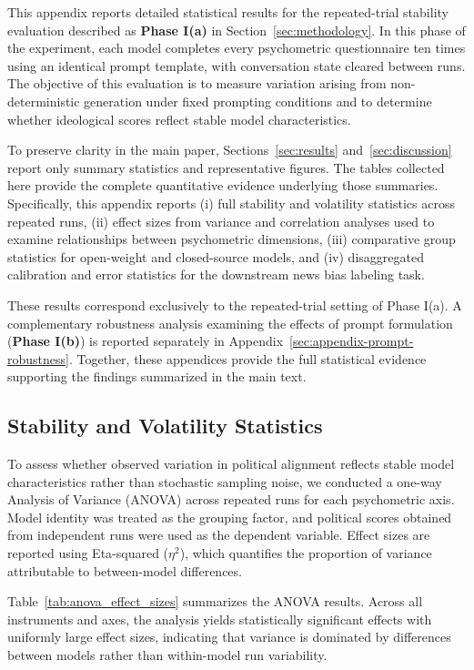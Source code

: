 \documentclass[11pt]{article}
\begin{document}
This appendix reports detailed statistical results for the repeated-trial stability evaluation described as \textbf{Phase I(a)} in Section~\ref{sec:methodology}. In this phase of the experiment, each model completes every psychometric questionnaire ten times using an identical prompt template, with conversation state cleared between runs. The objective of this evaluation is to measure variation arising from non-deterministic generation under fixed prompting conditions and to determine whether ideological scores reflect stable model characteristics.

To preserve clarity in the main paper, Sections~\ref{sec:results} and~\ref{sec:discussion} report only summary statistics and representative figures. The tables collected here provide the complete quantitative evidence underlying those summaries. Specifically, this appendix reports (i) full stability and volatility statistics across repeated runs, (ii) effect sizes from variance and correlation analyses used to examine relationships between psychometric dimensions, (iii) comparative group statistics for open-weight and closed-source models, and (iv) disaggregated calibration and error statistics for the downstream news bias labeling task.

These results correspond exclusively to the repeated-trial setting of Phase I(a). A complementary robustness analysis examining the effects of prompt formulation (\textbf{Phase I(b)}) is reported separately in Appendix~\ref{sec:appendix-prompt-robustness}. Together, these appendices provide the full statistical evidence supporting the findings summarized in the main text.



\subsection{Stability and Volatility Statistics}
\label{app:stability-volatility}

To assess whether observed variation in political alignment reflects stable model characteristics rather than stochastic sampling noise, we conducted a one-way Analysis of Variance (ANOVA) across repeated runs for each psychometric axis. Model identity was treated as the grouping factor, and political scores obtained from independent runs were used as the dependent variable. Effect sizes are reported using Eta-squared ($\eta^2$), which quantifies the proportion of variance attributable to between-model differences.

Table~\ref{tab:anova_effect_sizes} summarizes the ANOVA results. Across all instruments and axes, the analysis yields statistically significant effects with uniformly large effect sizes, indicating that variance is dominated by differences between models rather than within-model run variability.
\end{document}
